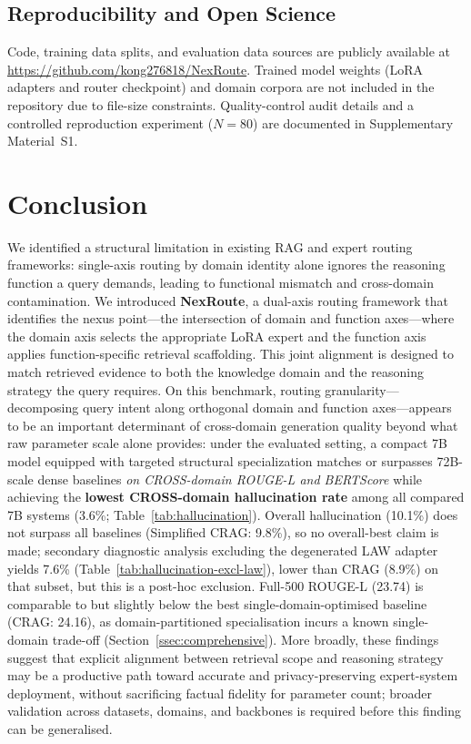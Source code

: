 \documentclass[a4paper,fleql]{cas-sc}
\begin{document}
\subsection{Reproducibility and Open Science}
\label{sec:reproducibility}
Code, training data splits, and evaluation data sources are publicly available at \url{https://github.com/kong276818/NexRoute}. Trained model weights (LoRA adapters and router checkpoint) and domain corpora are not included in the repository due to file-size constraints. Quality-control audit details and a controlled reproduction experiment ($N{=}80$) are documented in Supplementary Material~S1.

\section{Conclusion}
\label{sec:conclusion}
We identified a structural limitation in existing RAG and expert routing
frameworks: single-axis routing by domain identity alone ignores the
reasoning function a query demands, leading to functional mismatch and
cross-domain contamination.
We introduced \textbf{NexRoute}, a dual-axis routing framework that identifies
the nexus point---the intersection of domain and function axes---where the domain axis selects
the appropriate LoRA expert and the function axis applies function-specific retrieval scaffolding.
This joint alignment is designed to match retrieved evidence to both the
knowledge domain and the reasoning strategy the query requires.
On this benchmark, routing granularity---decomposing query intent
along orthogonal domain and function axes---appears to be an important determinant
of cross-domain generation quality beyond what raw parameter scale alone
provides: under the evaluated setting, a compact 7B model equipped with targeted
structural specialization matches or surpasses 72B-scale dense baselines
\emph{on CROSS-domain ROUGE-L and BERTScore} while achieving the \textbf{lowest CROSS-domain hallucination rate} among all
compared 7B systems (3.6\%; Table~\ref{tab:hallucination}). Overall hallucination
(10.1\%) does not surpass all baselines (Simplified CRAG: 9.8\%), so no
overall-best claim is made; secondary diagnostic analysis excluding the degenerated
LAW adapter yields 7.6\% (Table~\ref{tab:hallucination-excl-law}), lower than
CRAG (8.9\%) on that subset, but this is a post-hoc exclusion.
Full-500 ROUGE-L (23.74) is comparable to but slightly below the best
single-domain-optimised baseline (CRAG: 24.16), as domain-partitioned
specialisation incurs a known single-domain trade-off
(Section~\ref{ssec:comprehensive}). More broadly, these
findings suggest that explicit alignment between retrieval scope and reasoning
strategy may be a productive path toward accurate and privacy-preserving
expert-system deployment, without sacrificing factual fidelity for parameter
count; broader validation across datasets, domains, and backbones is required
before this finding can be generalised.
\end{document}
